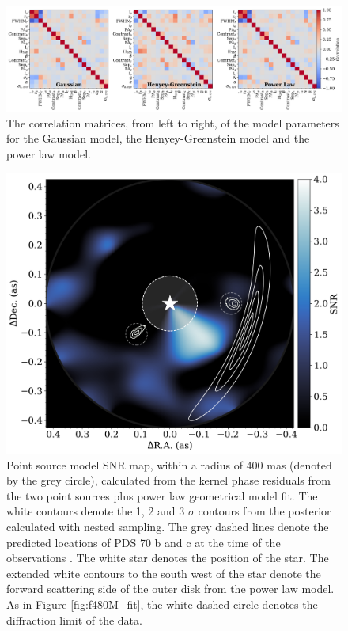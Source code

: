 \documentclass[11pt,twocolumn,twocolappendix]{aastex631}
\begin{document}
\begin{figure}
\centering
\includegraphics[width=1\linewidth]{correlations_NEW_OCT18.png}
\caption{The correlation matrices, from left to right, of the model parameters for the Gaussian model, the Henyey-Greenstein model and the power law model.}
\label{fig:f480M_correlations}
\end{figure}

\begin{figure}
\centering
\includegraphics[width=1\linewidth]{SNR_unif_revNEW_Oct18.png}
\caption{Point source model SNR map, {within a radius of 400 mas (denoted by the grey circle)}, calculated from the {kernel} phase residuals from the two point sources plus {power law} geometrical model fit. The white contours denote the 1, 2 and 3 $\sigma$ contours from the posterior calculated with nested sampling. The grey dashed lines denote the predicted locations of PDS 70 b and c at the time of the observations \citep{2021AJ....161..148W,2021ascl.soft01003W}. The white star denotes the position of the star. The extended white contours to the south west of the star denote the forward scattering side of the outer disk  {from the power law} model. As in Figure \ref{fig:f480M_fit}, the white dashed circle denotes the diffraction limit of the data.}

\label{fig:f480M_2pt_residuals_SNR}
\end{figure}
\end{document}
